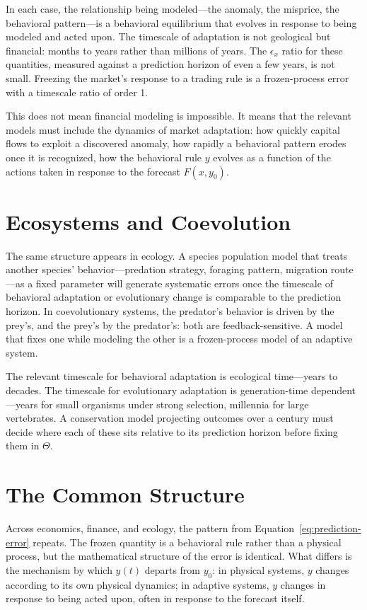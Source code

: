 \documentclass[11pt]{book}
\theoremstyle{plain}
\theoremstyle{definition}
\theoremstyle{remark}
\begin{document}
In each case, the relationship being modeled---the anomaly, the misprice, the behavioral pattern---is a behavioral equilibrium that evolves in response to being modeled and acted upon. The timescale of adaptation is not geological but financial: months to years rather than millions of years. The $\epsilon_x$ ratio for these quantities, measured against a prediction horizon of even a few years, is not small. Freezing the market's response to a trading rule is a frozen-process error with a timescale ratio of order 1.

This does not mean financial modeling is impossible. It means that the relevant models must include the dynamics of market adaptation: how quickly capital flows to exploit a discovered anomaly, how rapidly a behavioral pattern erodes once it is recognized, how the behavioral rule $y$ evolves as a function of the actions taken in response to the forecast $F(x, y_0)$.

\section{Ecosystems and Coevolution}

The same structure appears in ecology. A species population model that treats another species' behavior---predation strategy, foraging pattern, migration route---as a fixed parameter will generate systematic errors once the timescale of behavioral adaptation or evolutionary change is comparable to the prediction horizon. In coevolutionary systems, the predator's behavior is driven by the prey's, and the prey's by the predator's: both are feedback-sensitive. A model that fixes one while modeling the other is a frozen-process model of an adaptive system.

The relevant timescale for behavioral adaptation is ecological time---years to decades. The timescale for evolutionary adaptation is generation-time dependent---years for small organisms under strong selection, millennia for large vertebrates. A conservation model projecting outcomes over a century must decide where each of these sits relative to its prediction horizon before fixing them in $\Theta$.

\section{The Common Structure}

Across economics, finance, and ecology, the pattern from Equation~\eqref{eq:prediction-error} repeats. The frozen quantity is a behavioral rule rather than a physical process, but the mathematical structure of the error is identical. What differs is the mechanism by which $y(t)$ departs from $y_0$: in physical systems, $y$ changes according to its own physical dynamics; in adaptive systems, $y$ changes in response to being acted upon, often in response to the forecast itself.
\end{document}
